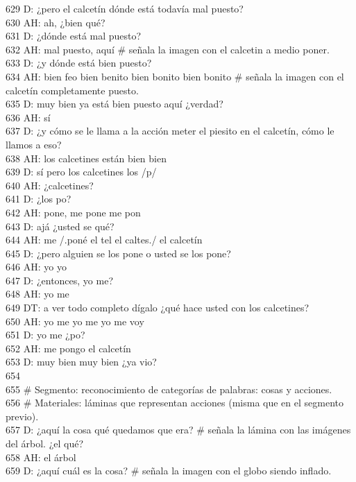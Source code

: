 629 D: ¿pero el calcetín dónde está todavía mal puesto?\\
630 AH: ah, ¿bien qué?\\
631 D: ¿dónde está mal puesto?\\
632 AH: mal puesto, aquí \# señala la imagen con el calcetin a medio poner.\\
633 D: ¿y dónde está bien puesto?\\
634 AH: bien feo bien benito bien bonito bien bonito \# señala la imagen con el calcetín completamente puesto.\\
635 D: muy bien ya está bien puesto aquí ¿verdad?\\
636 AH: sí\\
637 D: ¿y cómo se le llama a la acción meter el piesito en el calcetín, cómo le llamos a eso?\\
638 AH: los calcetines están bien bien\\
639 D: sí pero los calcetines los /p/\\
640 AH: ¿calcetines?\\
641 D: ¿los po?\\
642 AH: pone, me pone me pon\\
643 D: ajá ¿usted se qué?\\
644 AH: me /.poné el tel el caltes./ el calcetín\\
645 D: ¿pero alguien se los pone o usted se los pone?\\
646 AH: yo yo\\
647 D: ¿entonces, yo me?\\
648 AH: yo me\\
649 DT: a ver todo completo dígalo ¿qué hace usted con los calcetines?\\
650 AH: yo me yo me yo me voy\\
651 D: yo me ¿po?\\
652 AH: me pongo el calcetín\\
653 D: muy bien muy bien ¿ya vio?\\
654 \\
655 \# Segmento: reconocimiento de categorías de palabras: cosas y acciones.\\
656 \# Materiales: láminas que representan acciones (misma que en el segmento previo).\\
657 D: ¿aquí la cosa qué quedamos que era? \# señala la lámina con las imágenes del árbol. ¿el qué?\\
658 AH: el árbol\\
659 D: ¿aquí cuál es la cosa? \# señala la imagen con el globo siendo inflado.\\

